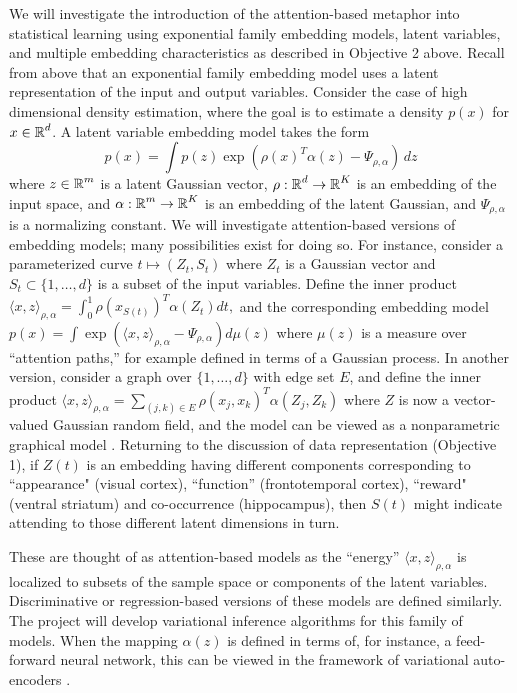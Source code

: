 We will investigate the introduction of the attention-based metaphor into
statistical learning using exponential family embedding models, latent
variables, and multiple embedding characteristics as described in
Objective 2 above. 
Recall from above that an exponential family embedding model uses a
latent representation of the input and output variables. Consider the
case of high dimensional density estimation, where the goal is to
estimate a density $p(x)$ for $x\in\mbox{$\mathbb{R}$}^d$.  A latent variable
embedding model takes the form
$$ p(x) = \int p(z) \exp(\rho(x)^T \alpha(z) - \Psi_{\rho,\alpha}) \, dz$$
where $z\in \mbox{$\mathbb{R}$}^m$ is a latent Gaussian vector,
$\rho:\mbox{$\mathbb{R}$}^d \to \mbox{$\mathbb{R}$}^K$ is an embedding of the input space,
and $\alpha: \mbox{$\mathbb{R}$}^m \to\mbox{$\mathbb{R}$}^K$ is an embedding of the latent
Gaussian, and $\Psi_{\rho,\alpha}$ is a normalizing constant.
We will investigate attention-based versions of embedding
models; many possibilities exist for doing so. For instance, consider a parameterized curve $t\mapsto (Z_t, S_t)$
where $Z_t$ is a Gaussian vector and $S_t \subset \{1,\ldots, d\}$
is a subset of the input variables. Define the inner product 
$\langle x, z\rangle_{\rho,\alpha}
= \int_{0}^1 \rho\left(x_{S(t)}\right)^T \alpha(Z_t) dt,$
and the corresponding embedding model
$ p(x) = \int \exp\left(\langle x, z\rangle_{\rho,\alpha} - \Psi_{\rho,\alpha}\right) d\mu(z)$ where $\mu(z)$ is a 
measure over ``attention paths,'' for example defined in terms of a Gaussian process.
In another version, consider a graph over $\{1,\ldots, d\}$ with edge
set $E$, and define the inner product
$\langle x, z\rangle_{\rho,\alpha}
= \sum_{(j,k)\in E} \rho(x_j, x_k)^T \alpha(Z_j, Z_k)$
where $Z$ is now a vector-valued Gaussian random field, 
and the model can be viewed as a nonparametric graphical model
\citep{hl18}. Returning to the discussion of data representation (Objective 1), 
if $Z(t)$ is an embedding having different components corresponding
to ``appearance" (visual cortex), ``function'' (frontotemporal cortex), ``reward"
(ventral striatum) and co-occurrence (hippocampus), then $S(t)$ might 
indicate attending to those different latent dimensions in turn.


These are thought of as attention-based models as the ``energy''
$\langle x, z\rangle_{\rho,\alpha}$ is localized to subsets of the
sample space or components of the latent variables. Discriminative or regression-based versions of these
models are defined similarly. The project will develop variational
inference algorithms for this family of models. When the mapping 
$\alpha(z)$ is defined in terms of, for instance, a feed-forward
neural network, this can be viewed in the framework of variational auto-encoders
\citep{kingma13}.



